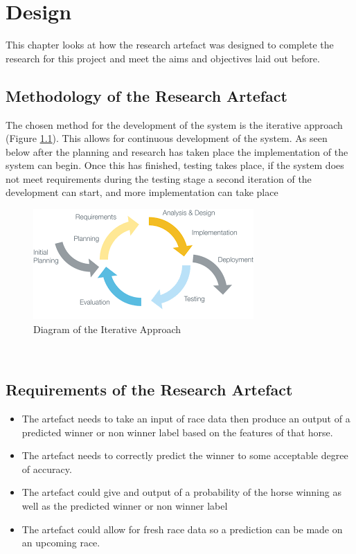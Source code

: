 \chapter{Design}\label{ch:Design}

This chapter looks at how the research artefact was designed to complete the research for this project and meet the aims and objectives laid out before.

\section{Methodology of the Research Artefact}
The chosen method for the development of the system is the iterative approach (Figure \ref{fig:ITA}). This allows for continuous development of the system. As seen below after the planning and research has taken place the implementation of the system can begin. Once this has finished, testing takes place, if the system does not meet requirements during the testing stage a second iteration of the development can start, and more implementation can take place
\begin{figure}[h!]
  \centering
  \includegraphics[width = (\textwidth)/2]{iterative.png}
  \caption{Diagram of the Iterative Approach}
  \label{fig:ITA}
\end{figure}\\

\section{Requirements of the Research Artefact}
\begin{itemize}
    \item The artefact needs to take an input of race data then produce an output of a predicted winner or non winner label based on the features of that horse.
    \item The artefact needs to correctly predict the winner to some acceptable degree of accuracy.
    \item The artefact could give and output of a probability of the horse winning as well as the predicted winner or non winner label 
    \item The artefact could allow for fresh race data so a prediction can be made on an upcoming race.
    
\end{itemize}

